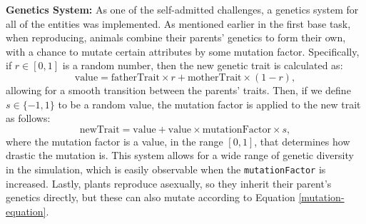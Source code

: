 \documentclass[10pt, a4paper]{scrartcl}
\begin{document}
\begin{multicols}{2}
        \noindent \textbf{Genetics System:} As one of the self-admitted challenges, a genetics system for all of the entities
        was implemented. As mentioned earlier in the first base task, when reproducing, animals combine their parents' genetics
        to form their own, with a chance to mutate certain attributes by some mutation factor. Specifically, if \( r \in [0, 1] \)
        is a random number, then the new genetic trait is calculated as:
        \begin{equation}
            \text{value} = \text{fatherTrait} \times r + \text{motherTrait} \times (1 - r), \nonumber
        \end{equation}
        allowing for a smooth transition between the parents' traits. Then, if we define \( s \in \{-1, 1\} \) to be a random
        value, the mutation factor is applied to the new trait as follows:
        \begin{equation}
            \label{mutation-equation}
            \text{newTrait} = \text{value} + \text{value} \times \text{mutationFactor} \times s,
        \end{equation}
        where the mutation factor is a value, in the range \( [0, 1] \), that determines how drastic the mutation is.
        This system allows for a wide range of genetic diversity in the simulation, which is easily observable when
        the \verb|mutationFactor| is increased. Lastly, plants reproduce asexually, so they inherit their parent's genetics
        directly, but these can also mutate according to Equation \ref{mutation-equation}.


\end{multicols}
\end{document}
